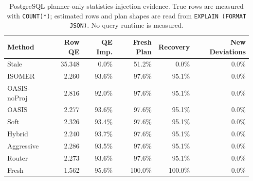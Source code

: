 \begin{table}[t]
  \centering
  \small
  \caption{PostgreSQL planner-only statistics-injection evidence. True rows are measured with \texttt{COUNT(*)}; estimated rows and plan shapes are read from \texttt{EXPLAIN (FORMAT JSON)}. No query runtime is measured.}
  \label{tab:postgres_planner_stats_injection}
  \setlength{\tabcolsep}{4pt}
  \begin{tabular}{lrrrrr}
    \toprule
    Method & Row QE & QE Imp. & Fresh Plan & Recovery & New Deviations \\
    \midrule
    Stale & 35.348 & 0.0\% & 51.2\% & 0.0\% & 0.0\% \\
    ISOMER & 2.260 & 93.6\% & 97.6\% & 95.1\% & 0.0\% \\
    OASIS-noProj & 2.816 & 92.0\% & 97.6\% & 95.1\% & 0.0\% \\
    OASIS & 2.277 & 93.6\% & 97.6\% & 95.1\% & 0.0\% \\
    Soft & 2.326 & 93.4\% & 97.6\% & 95.1\% & 0.0\% \\
    Hybrid & 2.240 & 93.7\% & 97.6\% & 95.1\% & 0.0\% \\
    Aggressive & 2.286 & 93.5\% & 97.6\% & 95.1\% & 0.0\% \\
    Router & 2.273 & 93.6\% & 97.6\% & 95.1\% & 0.0\% \\
    Fresh & 1.562 & 95.6\% & 100.0\% & 100.0\% & 0.0\% \\
    \bottomrule
  \end{tabular}
\end{table}
